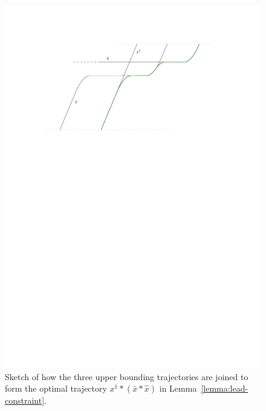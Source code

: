 \documentclass[a4paper]{article}
\theoremstyle{definition}
\theoremstyle{plain}
\begin{document}
\begin{figure}
  \centering
  \includegraphics[scale=1]{figures/motion/rough/proof}
  \caption{Sketch of how the three upper bounding trajectories are joined to
    form the optimal trajectory $x^{1} * (\bar{x} * \hat{x})$ in
    Lemma~\ref{lemma:lead-constraint}.}%
  \label{fig:theorem-proof}
\end{figure}
\end{document}
